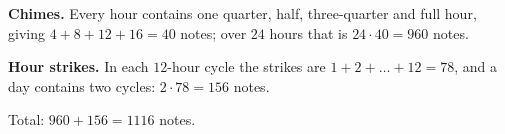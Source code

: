 \textbf{Chimes.} Every hour contains one quarter, half, three-quarter and full hour, giving $4+8+12+16=40$ notes; over $24$ hours that is $24\cdot40=960$ notes.

\textbf{Hour strikes.} In each $12$-hour cycle the strikes are $1+2+\dots+12=78$, and a day contains two cycles: $2\cdot78=156$ notes.

Total: $960+156=\boxed{1116}$ notes.
